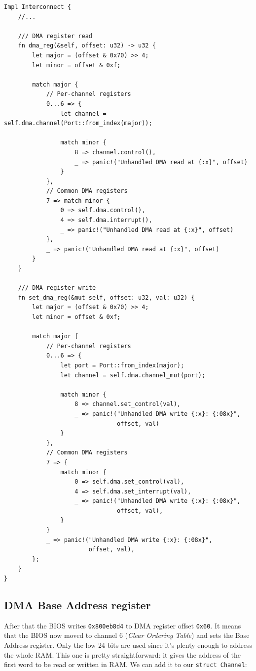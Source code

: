 \documentclass[a4paper]{article}
\newcommand{\code}[1] {\texttt{#1}}
\begin{document}
\begin{lstlisting}
Impl Interconnect {
    //...

    /// DMA register read
    fn dma_reg(&self, offset: u32) -> u32 {
        let major = (offset & 0x70) >> 4;
        let minor = offset & 0xf;

        match major {
            // Per-channel registers
            0...6 => {
                let channel = self.dma.channel(Port::from_index(major));

                match minor {
                    8 => channel.control(),
                    _ => panic!("Unhandled DMA read at {:x}", offset)
                }
            },
            // Common DMA registers
            7 => match minor {
                0 => self.dma.control(),
                4 => self.dma.interrupt(),
                _ => panic!("Unhandled DMA read at {:x}", offset)
            },
            _ => panic!("Unhandled DMA read at {:x}", offset)
        }
    }

    /// DMA register write
    fn set_dma_reg(&mut self, offset: u32, val: u32) {
        let major = (offset & 0x70) >> 4;
        let minor = offset & 0xf;

        match major {
            // Per-channel registers
            0...6 => {
                let port = Port::from_index(major);
                let channel = self.dma.channel_mut(port);

                match minor {
                    8 => channel.set_control(val),
                    _ => panic!("Unhandled DMA write {:x}: {:08x}",
                                offset, val)
                }
            },
            // Common DMA registers
            7 => {
                match minor {
                    0 => self.dma.set_control(val),
                    4 => self.dma.set_interrupt(val),
                    _ => panic!("Unhandled DMA write {:x}: {:08x}",
                                offset, val),
                }
            }
            _ => panic!("Unhandled DMA write {:x}: {:08x}",
                        offset, val),
        };
    }
}
\end{lstlisting}

\subsection{DMA Base Address register}

After that the BIOS writes \code{0x800eb8d4} to DMA register offset
\code{0x60}. It means that the BIOS now moved to channel 6
(\emph{Clear Ordering Table}) and sets the Base Address register. Only
the low 24 bits are used since it's plenty enough to address the whole
RAM. This one is pretty straightforward: it gives the address of the
first word to be read or written in RAM. We can add it to our
\code{struct Channel}:
\end{document}
